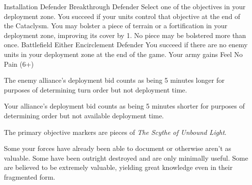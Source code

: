 \vfill

\noindent%
%
{}%
{Installation}%
{Defender}%
{Breakthrough}%
{Defender}%
{Select one of the objectives in your deployment zone.  You succeed if
  your units control that objective at the end of the Cataclysm.}%
{You may bolster a piece of terrain or a fortification in your
  deployment zone, improving its cover by 1.  No piece may be
  bolstered more than once.}
\hfill
%
{}%
{Battlefield}%
{Either}%
{Encirclement}%
{Defender}%
{You succeed if there are no enemy units in your deployment zone at
  the end of the game.}%
{Your army gains Feel No Pain (6+)}


\clearpage
\restorebackground



  The enemy alliance's deployment bid counts as being 5 minutes longer
  for purposes of determining turn order but not deployment time.

  Your alliance's deployment bid counts as being 5 minutes shorter for
  purposes of determining order but not available deployment time.


The primary objective markers are pieces of \emph{The Scythe of Unbound Light}.

Some your forces have already been able to document or otherwise
aren't as valuable.  Some have been outright destroyed and are only
minimally useful.  Some are believed to be extremely valuable,
yielding great knowledge even in their fragmented form.
